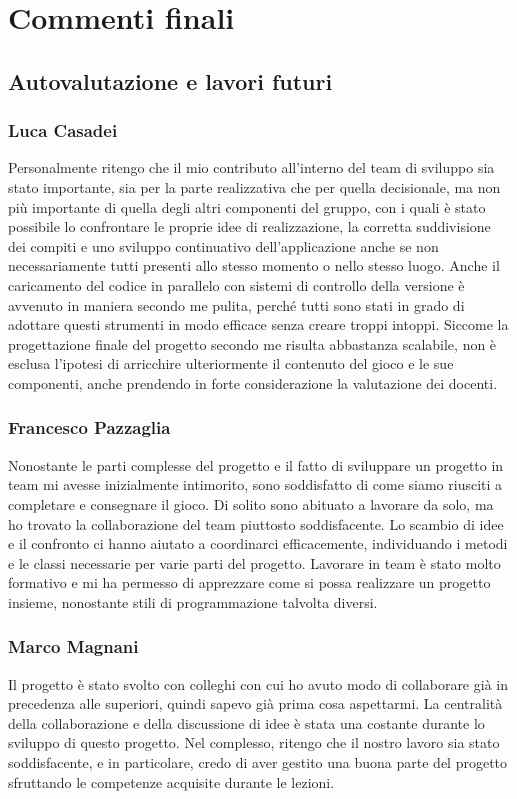 \documentclass[a4paper,12pt]{report}
\begin{document}
\chapter{Commenti finali}

\section{Autovalutazione e lavori futuri}

\subsection{Luca Casadei}
Personalmente ritengo che il mio contributo all'interno del team di sviluppo sia stato importante, sia per la parte realizzativa che per quella decisionale, ma non più importante di quella degli altri componenti del gruppo, con i quali è stato possibile lo confrontare le proprie idee di realizzazione, la corretta suddivisione dei compiti e uno sviluppo continuativo dell'applicazione anche se non necessariamente tutti presenti allo stesso momento o nello stesso luogo. Anche il caricamento del codice in parallelo con sistemi di controllo della versione è avvenuto in maniera secondo me pulita, perché tutti sono stati in grado di adottare questi strumenti in modo efficace senza creare troppi intoppi. Siccome la progettazione finale del progetto secondo me risulta abbastanza scalabile, non è esclusa l'ipotesi di arricchire ulteriormente il contenuto del gioco e le sue componenti, anche prendendo in forte considerazione la valutazione dei docenti.

\subsection{Francesco Pazzaglia}

Nonostante le parti complesse del progetto e il fatto di sviluppare un progetto in team mi avesse inizialmente intimorito, sono soddisfatto di come siamo riusciti a completare e consegnare il gioco. Di solito sono abituato a lavorare da solo, ma ho trovato la collaborazione del team piuttosto soddisfacente. Lo scambio di idee e il confronto ci hanno aiutato a coordinarci efficacemente, individuando i metodi e le classi necessarie per varie parti del progetto. Lavorare in team è stato molto formativo e mi ha permesso di apprezzare come si possa realizzare un progetto insieme, nonostante stili di programmazione talvolta diversi.

\subsection{Marco Magnani}
Il progetto è stato svolto con colleghi con cui ho avuto modo di collaborare già in precedenza alle superiori, quindi sapevo già prima cosa aspettarmi. La centralità della collaborazione e della discussione di idee è stata una costante durante lo sviluppo di questo progetto. Nel complesso, ritengo che il nostro lavoro sia stato soddisfacente, e in particolare, credo di aver gestito una buona parte del progetto sfruttando le competenze acquisite durante le lezioni.
\end{document}

